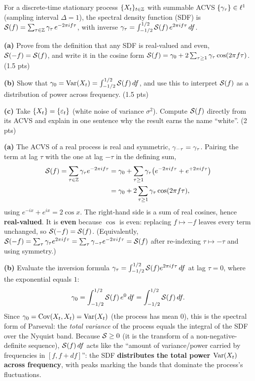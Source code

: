 \documentclass[11pt]{article}
\begin{document}

\statementstart
For a discrete-time stationary process $\{X_t\}_{t\in\mathbb{Z}}$ with summable ACVS $\{\gamma_\tau\}\in\ell^1$ (sampling interval $\Delta=1$), the spectral density function (SDF) is $\mathcal{S}(f)=\sum_{\tau\in\mathbb{Z}}\gamma_\tau\,e^{-2\pi i f\tau}$, with inverse $\gamma_\tau=\int_{-1/2}^{1/2}\mathcal{S}(f)\,e^{2\pi i f\tau}\,df$.

\textbf{(a)} Prove from the definition that any SDF is real-valued and even, $\mathcal{S}(-f)=\mathcal{S}(f)$, and write it in the cosine form $\mathcal{S}(f)=\gamma_0+2\sum_{\tau\ge1}\gamma_\tau\cos(2\pi f\tau)$. \hfill(1.5 pts)

\textbf{(b)} Show that $\gamma_0=\operatorname{Var}(X_t)=\int_{-1/2}^{1/2}\mathcal{S}(f)\,df$, and use this to interpret $\mathcal{S}(f)$ as a distribution of power across frequency. \hfill(1.5 pts)

\textbf{(c)} Take $\{X_t\}=\{\varepsilon_t\}$ (white noise of variance $\sigma^2$). Compute $\mathcal{S}(f)$ directly from its ACVS and explain in one sentence why the result earns the name ``white''. \hfill(2 pts)
\statementend

\textbf{(a)} The ACVS of a real process is real and symmetric, $\gamma_{-\tau}=\gamma_\tau$. Pairing the term at lag $\tau$ with the one at lag $-\tau$ in the defining sum,
\[
\begin{aligned}
\mathcal{S}(f)=\sum_{\tau\in\mathbb{Z}}\gamma_\tau e^{-2\pi i f\tau}
&=\gamma_0+\sum_{\tau\ge1}\gamma_\tau\bigl(e^{-2\pi i f\tau}+e^{+2\pi i f\tau}\bigr)\\
&=\gamma_0+2\sum_{\tau\ge1}\gamma_\tau\cos(2\pi f\tau),
\end{aligned}
\]
using $e^{-i x}+e^{i x}=2\cos x$. The right-hand side is a sum of real cosines, hence \textbf{real-valued}. It is \textbf{even} because $\cos$ is even: replacing $f\mapsto-f$ leaves every term unchanged, so $\mathcal{S}(-f)=\mathcal{S}(f)$. (Equivalently, $\mathcal{S}(-f)=\sum_\tau\gamma_\tau e^{2\pi i f\tau}=\sum_\tau\gamma_{-\tau}e^{-2\pi i f\tau}=\mathcal{S}(f)$ after re-indexing $\tau\mapsto-\tau$ and using symmetry.)

\textbf{(b)} Evaluate the inversion formula $\gamma_\tau=\int_{-1/2}^{1/2}\mathcal{S}(f)e^{2\pi i f\tau}\,df$ at lag $\tau=0$, where the exponential equals $1$:
\[
\gamma_0=\int_{-1/2}^{1/2}\mathcal{S}(f)\,e^{0}\,df=\int_{-1/2}^{1/2}\mathcal{S}(f)\,df .
\]
Since $\gamma_0=\operatorname{Cov}(X_t,X_t)=\operatorname{Var}(X_t)$ (the process has mean $0$), this is the spectral form of Parseval: the \emph{total variance} of the process equals the integral of the SDF over the Nyquist band. Because $\mathcal{S}\ge0$ (it is the transform of a non-negative-definite sequence), $\mathcal{S}(f)\,df$ acts like the ``amount of variance/power carried by frequencies in $[f,f+df]$'': the SDF \textbf{distributes the total power $\operatorname{Var}(X_t)$ across frequency}, with peaks marking the bands that dominate the process's fluctuations.
\end{document}
